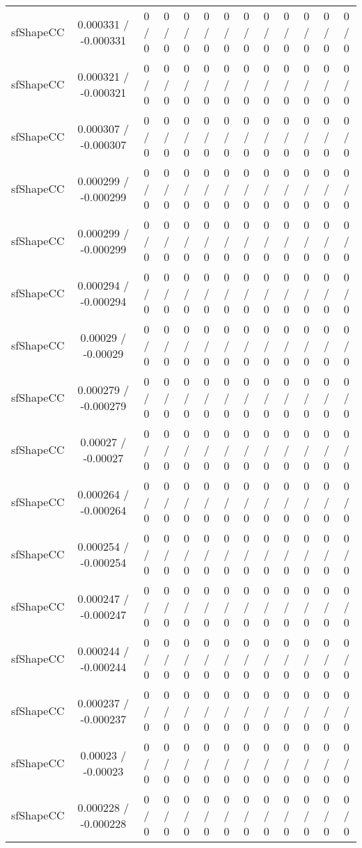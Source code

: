 \documentclass[10pt]{article}
\begin{document}
\begin{table}[htbp]
\begin{center}
\begin{tabular}{|c|c|c|c|c|c|c|c|c|c|c|c|c|}
  sfShapeCC & 0.000331 / -0.000331 & 0 / 0 & 0 / 0 & 0 / 0 & 0 / 0 & 0 / 0 & 0 / 0 & 0 / 0 & 0 / 0 & 0 / 0 & 0 / 0 & 0 / 0 \\ 
  sfShapeCC & 0.000321 / -0.000321 & 0 / 0 & 0 / 0 & 0 / 0 & 0 / 0 & 0 / 0 & 0 / 0 & 0 / 0 & 0 / 0 & 0 / 0 & 0 / 0 & 0 / 0 \\ 
  sfShapeCC & 0.000307 / -0.000307 & 0 / 0 & 0 / 0 & 0 / 0 & 0 / 0 & 0 / 0 & 0 / 0 & 0 / 0 & 0 / 0 & 0 / 0 & 0 / 0 & 0 / 0 \\ 
  sfShapeCC & 0.000299 / -0.000299 & 0 / 0 & 0 / 0 & 0 / 0 & 0 / 0 & 0 / 0 & 0 / 0 & 0 / 0 & 0 / 0 & 0 / 0 & 0 / 0 & 0 / 0 \\ 
  sfShapeCC & 0.000299 / -0.000299 & 0 / 0 & 0 / 0 & 0 / 0 & 0 / 0 & 0 / 0 & 0 / 0 & 0 / 0 & 0 / 0 & 0 / 0 & 0 / 0 & 0 / 0 \\ 
  sfShapeCC & 0.000294 / -0.000294 & 0 / 0 & 0 / 0 & 0 / 0 & 0 / 0 & 0 / 0 & 0 / 0 & 0 / 0 & 0 / 0 & 0 / 0 & 0 / 0 & 0 / 0 \\ 
  sfShapeCC & 0.00029 / -0.00029 & 0 / 0 & 0 / 0 & 0 / 0 & 0 / 0 & 0 / 0 & 0 / 0 & 0 / 0 & 0 / 0 & 0 / 0 & 0 / 0 & 0 / 0 \\ 
  sfShapeCC & 0.000279 / -0.000279 & 0 / 0 & 0 / 0 & 0 / 0 & 0 / 0 & 0 / 0 & 0 / 0 & 0 / 0 & 0 / 0 & 0 / 0 & 0 / 0 & 0 / 0 \\ 
  sfShapeCC & 0.00027 / -0.00027 & 0 / 0 & 0 / 0 & 0 / 0 & 0 / 0 & 0 / 0 & 0 / 0 & 0 / 0 & 0 / 0 & 0 / 0 & 0 / 0 & 0 / 0 \\ 
  sfShapeCC & 0.000264 / -0.000264 & 0 / 0 & 0 / 0 & 0 / 0 & 0 / 0 & 0 / 0 & 0 / 0 & 0 / 0 & 0 / 0 & 0 / 0 & 0 / 0 & 0 / 0 \\ 
  sfShapeCC & 0.000254 / -0.000254 & 0 / 0 & 0 / 0 & 0 / 0 & 0 / 0 & 0 / 0 & 0 / 0 & 0 / 0 & 0 / 0 & 0 / 0 & 0 / 0 & 0 / 0 \\ 
  sfShapeCC & 0.000247 / -0.000247 & 0 / 0 & 0 / 0 & 0 / 0 & 0 / 0 & 0 / 0 & 0 / 0 & 0 / 0 & 0 / 0 & 0 / 0 & 0 / 0 & 0 / 0 \\ 
  sfShapeCC & 0.000244 / -0.000244 & 0 / 0 & 0 / 0 & 0 / 0 & 0 / 0 & 0 / 0 & 0 / 0 & 0 / 0 & 0 / 0 & 0 / 0 & 0 / 0 & 0 / 0 \\ 
  sfShapeCC & 0.000237 / -0.000237 & 0 / 0 & 0 / 0 & 0 / 0 & 0 / 0 & 0 / 0 & 0 / 0 & 0 / 0 & 0 / 0 & 0 / 0 & 0 / 0 & 0 / 0 \\ 
  sfShapeCC & 0.00023 / -0.00023 & 0 / 0 & 0 / 0 & 0 / 0 & 0 / 0 & 0 / 0 & 0 / 0 & 0 / 0 & 0 / 0 & 0 / 0 & 0 / 0 & 0 / 0 \\ 
  sfShapeCC & 0.000228 / -0.000228 & 0 / 0 & 0 / 0 & 0 / 0 & 0 / 0 & 0 / 0 & 0 / 0 & 0 / 0 & 0 / 0 & 0 / 0 & 0 / 0 & 0 / 0 \\ 

\end{tabular}
\end{center}
\end{table}
\end{document}
